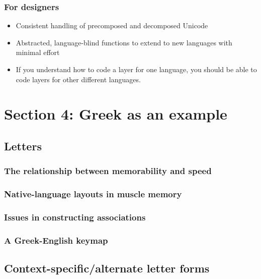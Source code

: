 \documentclass[11pt]{article}
\begin{document}
\subsubsection{For designers}
\label{sec:org9db374d}

\begin{itemize}
\item Consistent handling of precomposed and decomposed Unicode
\item Abstracted, language-blind functions to extend to new languages with minimal effort
\item If you understand how to code a layer for one language, you should be able to code layers for other different languages.
\end{itemize}

\section{Section 4: Greek as an example}
\label{sec:org65bd6b6}

\subsection{Letters}
\label{sec:org8d1a81d}

\subsubsection{The relationship between memorability and speed}
\label{sec:org2d07b0a}

\subsubsection{Native-language layouts in muscle memory}
\label{sec:orgfb633dc}

\subsubsection{Issues in constructing associations}
\label{sec:org8d7872e}

\subsubsection{A Greek-English keymap}
\label{sec:org15f05ce}

\subsection{Context-specific/alternate letter forms}
\label{sec:org3453677}
\end{document}

